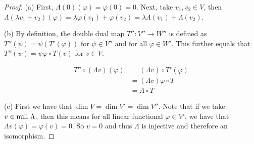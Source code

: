 \documentclass{extarticle}
\begin{document}
\begin{proof}
(a) First, \(\Lambda(0)(\varphi) = \varphi(0) = 0\). Next, take \(v_1, v_2 \in V\), then 
\(\Lambda(\lambda v_1 + v_2) (\varphi) = \lambda\varphi(v_1) + \varphi(v_2) = 
\lambda\Lambda(v_1) + \Lambda(v_2)\).

(b) By definition, the double dual map \(T'' \colon V'' \to W''\) is defined as 
\(T''(\psi) = \psi(T'(\varphi))\) for \(\psi \in V''\) and for all \(\varphi \in W'\). This 
further equals that \(T''(\psi) = \psi \varphi \circ T(v)\) for \(v \in V\). 

\begin{align*}
    T'' \circ (\Lambda v)(\varphi)
    &= (\Lambda v) \circ T' (\varphi) \\ 
    &= (\Lambda v) \varphi \circ T  \\ 
    &= \Lambda \circ T 
\end{align*}

(c) First we have that \(\dim V = \dim V' = \dim V''\). Note that if we take \(v \in \text{null } \Lambda\), 
then this means for all linear functional \(\varphi \in V'\), we have that \(\Lambda v (\varphi)
= \varphi(v) = 0\). So \(v = 0\) and thus \(\Lambda\) is injective and therefore an isomorphism.
\end{proof}
\end{document}
